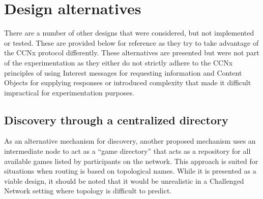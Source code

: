 \documentclass[a4paper,12pt]{report}      %
\begin{document}
\section{Design alternatives}

There are a number of other designs that were considered, but not implemented or tested. These are
provided below for reference as they try to take advantage of the CCNx protocol differently. These
alternatives are presented but were not part of the experimentation as they either do not strictly adhere
to the CCNx principles of using Interest messages for requesting information and Content Objects for
supplying responses or introduced complexity that made it difficult impractical for experimentation
purposes.

\subsection{Discovery through a centralized directory}

As an alternative mechanism for discovery, another proposed mechanism uses an intermediate node to
act as a “game directory” that acts as a repository for all available games listed by participants on the
network. This approach is suited for situations when routing is based on topological names. While it is
presented as a viable design, it should be noted that it would be unrealistic in a Challenged Network setting
where topology is difficult to predict. 
\end{document}
